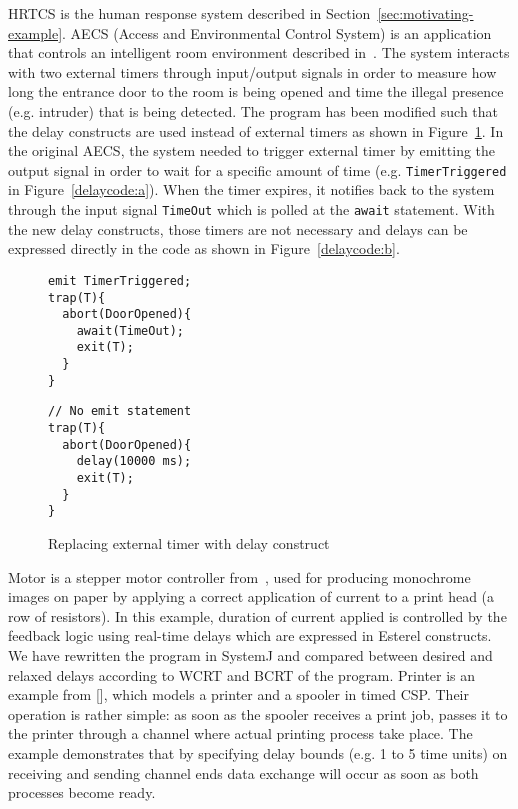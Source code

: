 HRTCS is the human response system described in
Section~\ref{sec:motivating-example}. AECS (Access and Environmental
Control System) is an application that controls an intelligent room
environment described in~\cite{aecs_ispa}.  The system interacts with
two external timers through input/output signals in order to measure how
long the entrance door to the room is being opened and time the illegal
presence (e.g. intruder) that is being detected. The program has been
modified such that the delay constructs are used instead of external
timers as shown in Figure~\ref{delaycode}. In the original AECS, the
system needed to trigger external timer by emitting the output signal in
order to wait for a specific amount of time (e.g.
\texttt{TimerTriggered} in Figure~\ref{delaycode:a}). When the timer
expires, it notifies back to the system through the input signal
\texttt{TimeOut} which is polled at the \texttt{await} statement. With
the new delay constructs, those timers are not necessary and delays can
be expressed directly in the code as shown in Figure~\ref{delaycode:b}.

\begin{figure}[h!]
	\begin{SubFloat}{\label{delaycode:a}}
		\centering
		\begin{minipage}[b]{0.3\linewidth}
			\scriptsize
\begin{verbatim}
emit TimerTriggered;
trap(T){
  abort(DoorOpened){
    await(TimeOut);
    exit(T); 
  }
}
\end{verbatim}
		\end{minipage}
	\end{SubFloat}
\hspace{1cm}%
	\begin{SubFloat}{\label{delaycode:b}}
		\centering
		\begin{minipage}[b]{0.5\linewidth}
			\scriptsize
\begin{verbatim}
// No emit statement
trap(T){
  abort(DoorOpened){
    delay(10000 ms);
    exit(T);  
  }
}
\end{verbatim}
		\end{minipage}
	\end{SubFloat}
\caption{Replacing external timer with delay construct}
\label{delaycode}
\end{figure}

Motor is a stepper motor controller from~\cite{Bourke2009a}, used for
producing monochrome images on paper by applying a correct application
of current to a print head (a row of resistors). In this example,
duration of current applied is controlled by the feedback logic using
real-time delays which are expressed in Esterel constructs. We have
rewritten the program in SystemJ and compared between desired and
relaxed delays according to WCRT and BCRT of the program. Printer is an
example from [], which models a printer and a spooler in timed CSP.
Their operation is rather simple: as soon as the spooler receives a
print job, passes it to the printer through a channel where actual
printing process take place. The example demonstrates that by specifying
delay bounds (e.g. 1 to 5 time units) on receiving and sending channel
ends data exchange will occur as soon as both processes become ready.


